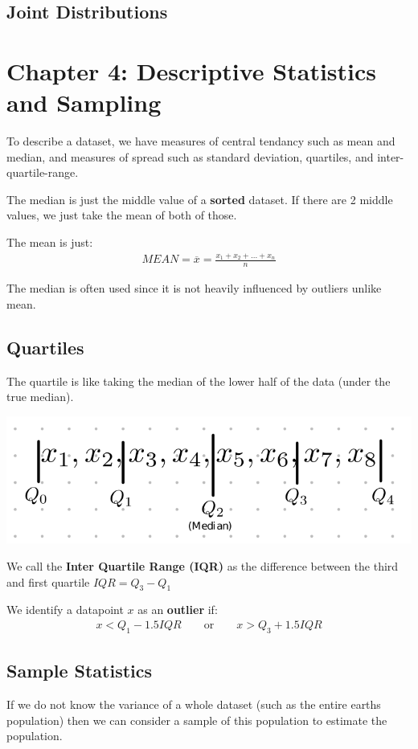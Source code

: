 \documentclass[12pt,letterpaper]{article} \usepackage{amsmath} \usepackage{graphicx} \usepackage[margin=1in]{geometry} \usepackage{longtable}  \usepackage{amssymb}
\begin{document}
	\subsection{Joint Distributions}
	
	\section{Chapter 4: Descriptive Statistics and Sampling}
	To describe a dataset, we have measures of central tendancy such as mean and median, and measures of spread such as standard deviation, quartiles, and inter-quartile-range. 
	
	The median is just the middle value of a \textbf{sorted} dataset. If there are 2 middle values, we just take the mean of both of those. 
	
	The mean is just:
	\begin{align*}
		MEAN = \overline{x} = \frac{x_1 + x_2 + ... + x_n}{n}
	\end{align*}

	The median is often used since it is not heavily influenced by outliers unlike mean. 
	
	\subsection{Quartiles}
	The quartile is like taking the median of the lower half of the data (under the true median). 
	\begin{center}
		\includegraphics[width=0.4\linewidth]{quartiles}
	\end{center}
	We call the \textbf{Inter Quartile Range (IQR)} as the difference between the third and first quartile $IQR = Q_3-Q_1$

	We identify a datapoint $x$ as an \textbf{outlier} if:
	\begin{align*}
		x < Q_1 - 1.5IQR \qquad \text{or} \qquad x>Q_3 + 1.5IQR
	\end{align*}

	\subsection{Sample Statistics}
	If we do not know the variance of a whole dataset (such as the entire earths population) then we can consider a sample of this population to estimate the population. 
	
\end{document}
